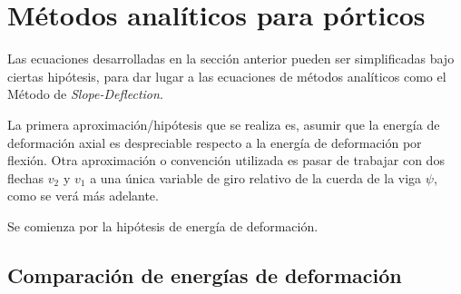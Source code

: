 
%






%
%
%
%







\section{Métodos analíticos para pórticos} \label{sec:metSDPort}

Las ecuaciones desarrolladas en la sección anterior pueden ser simplificadas bajo ciertas hipótesis, para dar lugar a las ecuaciones de métodos analíticos como el Método de \textit{Slope-Deflection}.

La primera aproximación/hipótesis que se realiza es, asumir que la energía de deformación axial es despreciable respecto a la energía de deformación por flexión. %
Otra aproximación o convención utilizada es pasar de trabajar con dos flechas $v_2$ y $v_1$ a una única variable de giro relativo de la cuerda de la viga $\psi$, como se verá más adelante.

Se comienza por la hipótesis de energía de deformación.

\subsection{Comparación de energías de deformación}


